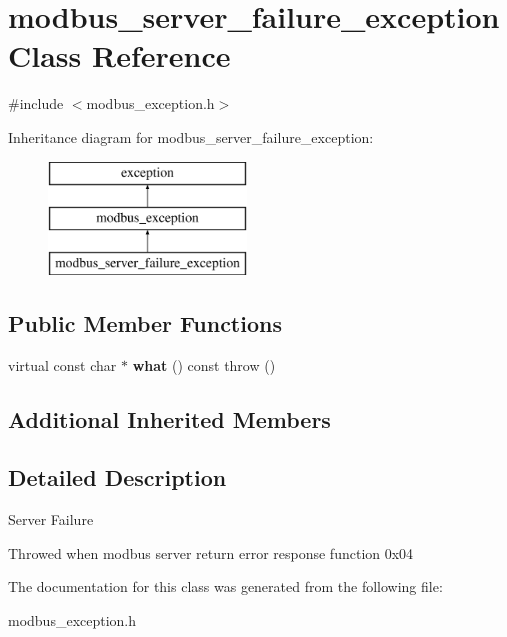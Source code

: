\hypertarget{classmodbus__server__failure__exception}{}\section{modbus\+\_\+server\+\_\+failure\+\_\+exception Class Reference}
\label{classmodbus__server__failure__exception}


{\ttfamily \#include $<$modbus\+\_\+exception.\+h$>$}

Inheritance diagram for modbus\+\_\+server\+\_\+failure\+\_\+exception\+:\begin{figure}[H]
\begin{center}
\leavevmode
\includegraphics[height=3.000000cm]{classmodbus__server__failure__exception}
\end{center}
\end{figure}
\subsection*{Public Member Functions}
\begin{DoxyCompactItemize}
\item 
\mbox{\label{classmodbus__server__failure__exception_ac9031d4df9e2abd921b50b482aaaaab4}} 
virtual const char $\ast$ {\bfseries what} () const  throw ()
\end{DoxyCompactItemize}
\subsection*{Additional Inherited Members}


\subsection{Detailed Description}
Server Failure

Throwed when modbus server return error response function 0x04 

The documentation for this class was generated from the following file\+:\begin{DoxyCompactItemize}
\item 
modbus\+\_\+exception.\+h\end{DoxyCompactItemize}
